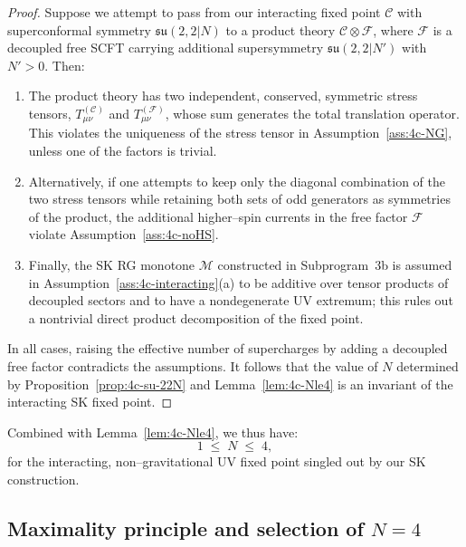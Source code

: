 \begin{proof}
Suppose we attempt to pass from our interacting fixed point \(\mathcal C\)
with superconformal symmetry \(\mathfrak{su}(2,2|N)\) to a product theory
\(\mathcal C\otimes\mathcal F\), where \(\mathcal F\) is a decoupled free
SCFT carrying additional supersymmetry \(\mathfrak{su}(2,2|N')\) with
\(N'>0\).  Then:

\begin{enumerate}[(1)]
  \item The product theory has two independent, conserved, symmetric
        stress tensors, \(T_{\mu\nu}^{(\mathcal C)}\) and
        \(T_{\mu\nu}^{(\mathcal F)}\), whose sum generates the total
        translation operator.  This violates the uniqueness of the
        stress tensor in Assumption~\ref{ass:4c-NG}, unless one of the
        factors is trivial.

  \item Alternatively, if one attempts to keep only the diagonal
        combination of the two stress tensors while retaining both sets
        of odd generators as symmetries of the product, the additional
        higher–spin currents in the free factor \(\mathcal F\) violate
        Assumption~\ref{ass:4c-noHS}.

  \item Finally, the SK RG monotone \(\mathcal M\) constructed in
        Subprogram~3b is assumed in
        Assumption~\ref{ass:4c-interacting}(a) to be additive over
        tensor products of decoupled sectors and to have a
        nondegenerate UV extremum; this rules out a nontrivial direct
        product decomposition of the fixed point.
\end{enumerate}

In all cases, raising the effective number of supercharges by adding a
decoupled free factor contradicts the assumptions.  It follows that the
value of \(N\) determined by Proposition~\ref{prop:4c-su-22N} and
Lemma~\ref{lem:4c-Nle4} is an invariant of the interacting SK fixed
point.
\end{proof}

Combined with Lemma~\ref{lem:4c-Nle4}, we thus have:
\begin{equation}
  1 \;\le\; N \;\le\; 4,
\end{equation}
for the interacting, non–gravitational UV fixed point singled out by
our SK construction.

\subsection{Maximality principle and selection of \texorpdfstring{$N=4$}{N=4}}
\label{subsec:4c-maximality}

